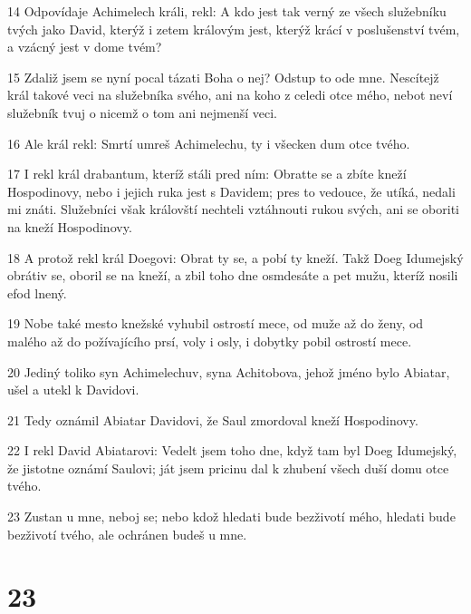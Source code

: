 \par 14 Odpovídaje Achimelech králi, rekl: A kdo jest tak verný ze všech služebníku tvých jako David, kterýž i zetem královým jest, kterýž krácí v poslušenství tvém, a vzácný jest v dome tvém?
\par 15 Zdaliž jsem se nyní pocal tázati Boha o nej? Odstup to ode mne. Nescítejž král takové veci na služebníka svého, ani na koho z celedi otce mého, nebot neví služebník tvuj o nicemž o tom ani nejmenší veci.
\par 16 Ale král rekl: Smrtí umreš Achimelechu, ty i všecken dum otce tvého.
\par 17 I rekl král drabantum, kteríž stáli pred ním: Obratte se a zbíte kneží Hospodinovy, nebo i jejich ruka jest s Davidem; pres to vedouce, že utíká, nedali mi znáti. Služebníci však královští nechteli vztáhnouti rukou svých, ani se oboriti na kneží Hospodinovy.
\par 18 A protož rekl král Doegovi: Obrat ty se, a pobí ty kneží. Takž Doeg Idumejský obrátiv se, oboril se na kneží, a zbil toho dne osmdesáte a pet mužu, kteríž nosili efod lnený.
\par 19 Nobe také mesto knežské vyhubil ostrostí mece, od muže až do ženy, od malého až do požívajícího prsí, voly i osly, i dobytky pobil ostrostí mece.
\par 20 Jediný toliko syn Achimelechuv, syna Achitobova, jehož jméno bylo Abiatar, ušel a utekl k Davidovi.
\par 21 Tedy oznámil Abiatar Davidovi, že Saul zmordoval kneží Hospodinovy.
\par 22 I rekl David Abiatarovi: Vedelt jsem toho dne, když tam byl Doeg Idumejský, že jistotne oznámí Saulovi; ját jsem pricinu dal k zhubení všech duší domu otce tvého.
\par 23 Zustan u mne, neboj se; nebo kdož hledati bude bezživotí mého, hledati bude bezživotí tvého, ale ochránen budeš u mne.

\chapter{23}

